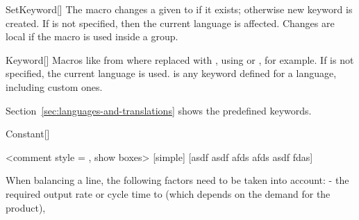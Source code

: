 \documentclass[a4paper, 11pt]{article}
\begin{document}
\begin{macro}{SetKeyword}[]
    The macro  changes a given  to  if it exists; otherwise new keyword is created.
    If  is not specified, then the current language is affected. Changes are local if the macro is used inside a group.
\end{macro}

\begin{macro}{Keyword}[]
    Macros like  from  where replaced with , using  or , for example.
    If  is not specified, the current language is used.  is any keyword defined for a language, including custom ones.

    Section~\ref{sec:languages-and-translations} shows the predefined keywords.

\end{macro}

\begin{macro}{Constant}[]
\end{macro}



\clearpage
\printindex

\begin{algorithmic}
    <comment style = {}, show boxes>
    \EndIf[fim]
    [simple]
    \EndIf
    [asdf asdf afds afds asdf fdas]
    \EndIf
\end{algorithmic}

\vspace{1cm}
When balancing a line, the following factors
need to be taken into account:
- the required output rate or cycle time to (which
depends on the demand for the product),
\end{document}
